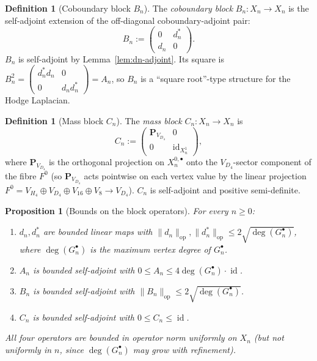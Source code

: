 \documentclass[11pt, a4paper]{amsart}
\newtheorem{proposition}[theorem]{Proposition}
\theoremstyle{definition}
\newtheorem{definition}[theorem]{Definition}
\newcommand{\id}{\operatorname{id}}
\newcommand{\op}{\operatorname{op}}
\begin{document}
\begin{definition}[Coboundary block $B_n$]
\label{def:Bn}
The \emph{coboundary block} $B_n \colon X_n \to X_n$ is the
self-adjoint extension of the off-diagonal coboundary-adjoint
pair:
\[
  B_n := \begin{pmatrix} 0 & d_n^* \\ d_n & 0 \end{pmatrix}.
\]
$B_n$ is self-adjoint by Lemma~\ref{lem:dn-adjoint}. Its square is
$B_n^2 = \begin{pmatrix} d_n^* d_n & 0 \\ 0 & d_n d_n^* \end{pmatrix}
= A_n$, so $B_n$ is a ``square root''-type structure for the
Hodge Laplacian.
\end{definition}

\begin{definition}[Mass block $C_n$]
\label{def:Cn}
The \emph{mass block} $C_n \colon X_n \to X_n$ is
\[
  C_n := \begin{pmatrix} \mathbf{P}_{V_{D_4}} & 0 \\ 0 & \id_{X_n^1}
    \end{pmatrix},
\]
where $\mathbf{P}_{V_{D_4}}$ is the orthogonal projection on
$X_n^{0, \bullet}$ onto the $V_{D_4}$-sector component of the
fibre $F^0$ (so $\mathbf{P}_{V_{D_4}}$ acts pointwise on each
vertex value by the linear projection $F^0 = V_{H_4} \oplus
V_{D_4} \oplus V_{16} \oplus V_8 \to V_{D_4}$). $C_n$ is
self-adjoint and positive semi-definite.
\end{definition}

\begin{proposition}[Bounds on the block operators]
\label{prop:block-bounds}
For every $n \geq 0$:
\begin{enumerate}
\item $d_n, d_n^*$ are bounded linear maps with $\|d_n\|_{\op},
  \|d_n^*\|_{\op} \leq 2 \sqrt{\deg(G_n^\bullet)}$, where
  $\deg(G_n^\bullet)$ is the maximum vertex degree of
  $G_n^\bullet$.
\item $A_n$ is bounded self-adjoint with $0 \leq A_n \leq 4
  \deg(G_n^\bullet) \cdot \id$.
\item $B_n$ is bounded self-adjoint with $\|B_n\|_{\op} \leq 2
  \sqrt{\deg(G_n^\bullet)}$.
\item $C_n$ is bounded self-adjoint with $0 \leq C_n \leq \id$.
\end{enumerate}
All four operators are bounded in operator norm uniformly on
$X_n$ (but not uniformly in $n$, since $\deg(G_n^\bullet)$ may
grow with refinement).
\end{proposition}
\end{document}
